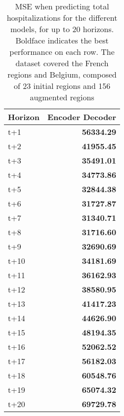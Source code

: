 \begin{table}[H]
\centering
\caption{MSE when predicting total hospitalizations for the different models, for up to 20 horizons. Boldface indicates the best performance on each row. The dataset covered the French regions and Belgium, composed of 23 initial regions and 156 augmented regions }
\label{tab:MSE_comparison}
\begin{tabular}{lr}
\toprule
Horizon &  Encoder Decoder \\
\midrule
t+1  & \textbf{56334.29}  \\
t+2  & \textbf{41955.45}  \\
t+3  & \textbf{35491.01}  \\
t+4  & \textbf{34773.86}  \\
t+5  & \textbf{32844.38}  \\
t+6  & \textbf{31727.87}  \\
t+7  & \textbf{31340.71}  \\
t+8  & \textbf{31716.60}  \\
t+9  & \textbf{32690.69}  \\
t+10  & \textbf{34181.69}  \\
t+11  & \textbf{36162.93}  \\
t+12  & \textbf{38580.95}  \\
t+13  & \textbf{41417.23}  \\
t+14  & \textbf{44626.90}  \\
t+15  & \textbf{48194.35}  \\
t+16  & \textbf{52062.52}  \\
t+17  & \textbf{56182.03}  \\
t+18  & \textbf{60548.76}  \\
t+19  & \textbf{65074.32}  \\
t+20  & \textbf{69729.78}  \\

\bottomrule
\end{tabular}
\end{table}
